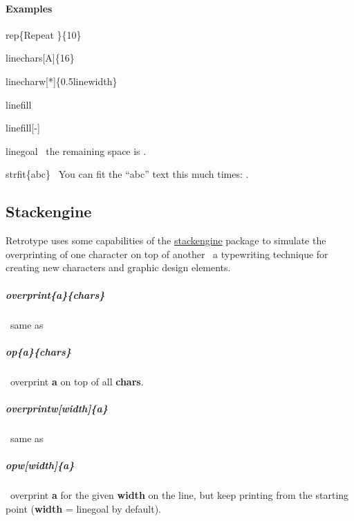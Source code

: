 \documentclass[english,12pt,openany,letterpaper]{book}
\begin{document}
\paragraph{Examples}

\bs rep\{Repeat \}\{10\}


\skipline

\bs linechars[A]\{16\}


\skipline

\bs linecharw[*]\{0.5\bs linewidth\}


\skipline

\bs linefill

\linefill

\skipline

\bs linefill[-]

\linefill[-]

\skipline

\bs linegoal \dash\ the remaining space is \linegoal.%

\skipline

\bs strfit\{abc\} \dash\ You can fit the ``abc'' text this much times: .


\break


\subsection{Stackengine}

Retrotype uses some capabilities of the \href{https://www.ctan.org/pkg/stackengine}{stackengine} package to simulate the overprinting of one character on top of another \dash\ a typewriting technique for creating new characters and graphic design elements.

\skipline

\subparagraph{\bs overprint\{a\}\{chars\}} \dash\ same as

\subparagraph{\tabspace\bs op\{a\}\{chars\}} \dash\ overprint \textbf{a} on top of all \textbf{chars}.

\subparagraph{\bs overprintw[width]\{a\}} \dash\ same as

\subparagraph{\tabspace\bs opw[width]\{a\}} \dash\ overprint \textbf{a} for the given \textbf{width} on the line, but keep printing from the starting point (\textbf{width} = \bs linegoal by default).
\end{document}
